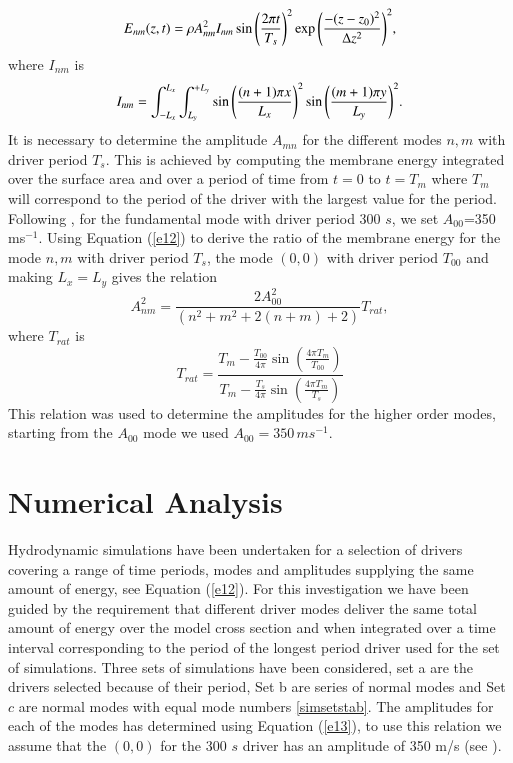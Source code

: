 \documentclass[authoryear,final,1p]{elsarticle}
\begin{document}
\begin{equation}
E_{nm}(z,t)= \rho A_{nm}^{2} I_{nm}  \sin{\left({2\pi t}\over{T_s} \right)  }^{2}
\exp{\left( -{(z-z_0)^{2}}\over{\Delta z^{2}} \right) }^{2},
\label{e12}
\end{equation}
where $I_{nm}$ is
\begin{equation}
I_{nm}=  \int_{-L_{x}}^{L_{x}} \int_{L_{y}}^{+L_{y}} \sin{\left(  {(n+1)\pi x}\over{L_x} \right)}^{2}   \sin{\left(  {(m+1)\pi y}\over{L_y} \right)}^{2}. \nonumber
\end{equation}
It is necessary to determine the amplitude $A_{mn}$ for the different modes $n, m$ with driver period 
$T_{s}$. This is achieved by computing the membrane energy integrated over the surface area and 
over a period of time from $t=0$ to $t=T_{m}$ where $T_m$ will correspond to the period of the driver 
with the largest value for the period. Following  \citet{Leighton1960}, for the fundamental mode with 
driver period 300 $s$, we set $A_{00}$=350\, ms$^{-1}$. 
Using Equation (\ref{e12}) to derive the ratio of the membrane energy for the mode $n, m$ with 
driver period $T_{s}$, the mode $(0, 0)$ with driver period $T_{00}$ and making $L_x=L_y$ 
gives the relation
\begin{equation}
A_{nm}^{2}=\frac{2A_{00}^{2}}{(n^2+m^2+2(n+m)+2)}T_{rat},
\label{e13}
\end{equation}
where $T_{rat}$ is
\begin{equation}\label{eqtrat}
T_{rat}=
\frac{T_m-\frac{T_{00}}{4\pi}   \sin(\frac{4\pi T_m}{T_{00}})    }{T_m-\frac{T_{s}}{4\pi}   \sin(\frac{4\pi T_m}{T_{s}})  }
\end{equation}
This relation was used to determine the amplitudes for the higher order modes, starting from the $A_{00}$ mode we used  $A_{00}=350\, ms^{-1}$.

\section{Numerical Analysis}
Hydrodynamic simulations have been undertaken for a selection of drivers covering a range of time periods, modes and amplitudes supplying the same amount of energy, see Equation (\ref{e12}). For this investigation we have been guided by the requirement that  different driver modes deliver the same total amount of energy over the model cross section and when integrated over a time interval corresponding to the period of the longest period driver used for the set of simulations. Three sets of simulations have been considered, set a are the drivers selected because of their period, Set b are series of normal modes and Set $c$  are normal modes with equal mode numbers \ref{simsetstab}. The amplitudes for each of the modes has determined using  Equation (\ref{e13}), to use this relation we assume that the $(0, 0)$ for the 300 $s$ driver has an amplitude of 350 m/s (see \citet{Leighton1960}).
\end{document}
